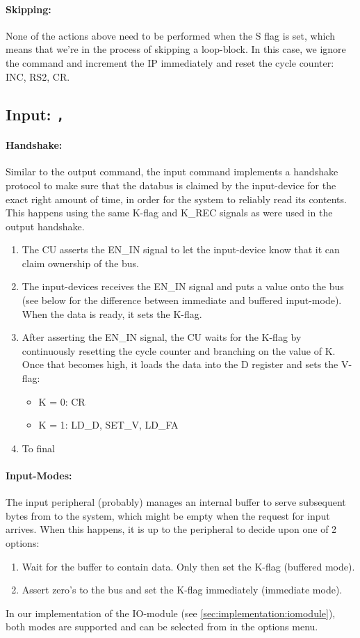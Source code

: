 \paragraph{Skipping:} None of the actions above need to be performed when the S flag is set, which means that we're in the process of skipping a loop-block. In this case, we ignore the command and increment the IP immediately and reset the cycle counter: INC, RS2, CR.

\subsection{Input: \texttt{,}}
\paragraph{Handshake:} Similar to the output command, the input command implements a handshake protocol to make sure that the databus is claimed by the input-device for the exact right amount of time, in order for the system to reliably read its contents. This happens using the same K-flag and K\_REC signals as were used in the output handshake.
\begin{enumerate}
\item The CU asserts the EN\_IN signal to let the input-device know that it can claim ownership of the bus.
\item The input-devices receives the EN\_IN signal and puts a value onto the bus (see below for the difference between immediate and buffered input-mode). When the data is ready, it sets the K-flag.
\item After asserting the EN\_IN signal, the CU waits for the K-flag by continuously resetting the cycle counter and branching on the value of K. Once that becomes high, it loads the data into the D register and sets the V-flag:
  \begin{itemize}
  \item K = 0: CR
  \item K = 1: LD\_D, SET\_V, LD\_FA
  \end{itemize}
\item To final
\end{enumerate}

\paragraph{Input-Modes:} The input peripheral (probably) manages an internal buffer to serve subsequent bytes from to the system, which might be empty when the request for input arrives. When this happens, it is up to the peripheral to decide upon one of 2 options:
\begin{enumerate}
\item Wait for the buffer to contain data. Only then set the K-flag (buffered mode).
\item Assert zero's to the bus and set the K-flag immediately (immediate mode).
\end{enumerate}
In our implementation of the IO-module (see \ref{sec:implementation:iomodule}), both modes are supported and can be selected from in the options menu.

